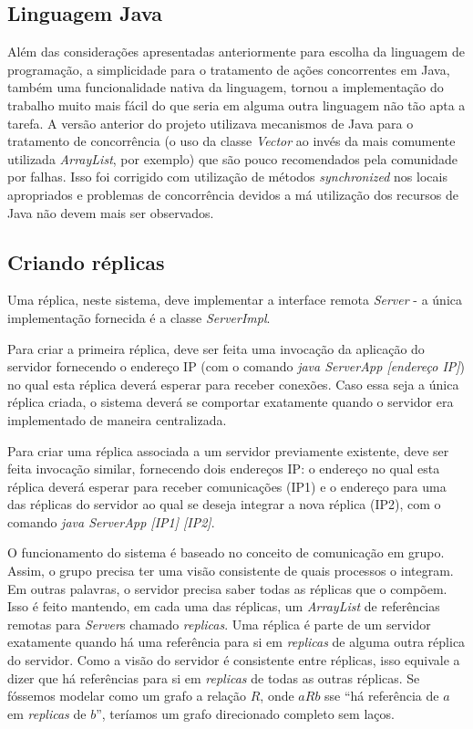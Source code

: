 \documentclass[../main.tex]{subfiles}
\begin{document}
\subsection{Linguagem Java}

Além das considerações apresentadas anteriormente para escolha da linguagem de programação, a simplicidade para o tratamento de ações concorrentes em Java, também uma funcionalidade nativa da linguagem, tornou a implementação do trabalho muito mais fácil do que seria em alguma outra linguagem não tão apta a tarefa.
A versão anterior do projeto utilizava mecanismos de Java para o tratamento de concorrência (o uso da classe \textit{Vector} ao invés da mais comumente utilizada \textit{ArrayList}, por exemplo) que são pouco recomendados pela comunidade por falhas.
Isso foi corrigido com utilização de métodos \textit{synchronized} nos locais apropriados e problemas de concorrência devidos a má utilização dos recursos de Java não devem mais ser observados.

\subsection{Criando réplicas} \label{subsec:replicas}

Uma réplica, neste sistema, deve implementar a interface remota \textit{Server} - a única implementação fornecida é a classe \textit{ServerImpl}.

Para criar a primeira réplica, deve ser feita uma invocação da aplicação do servidor fornecendo o endereço IP (com o comando \textit{java ServerApp [endereço IP]}) no qual esta réplica deverá esperar para receber conexões.
Caso essa seja a única réplica criada, o sistema deverá se comportar exatamente quando o servidor era implementado de maneira centralizada.

Para criar uma réplica associada a um servidor previamente existente, deve ser feita invocação similar, fornecendo dois endereços IP: o endereço no qual esta réplica deverá esperar para receber comunicações (IP1) e o endereço para uma das réplicas do servidor ao qual se deseja integrar a nova réplica (IP2), com o comando \textit{java ServerApp [IP1] [IP2]}.

O funcionamento do sistema é baseado no conceito de comunicação em grupo.
Assim, o grupo precisa ter uma visão consistente de quais processos o integram.
Em outras palavras, o servidor precisa saber todas as réplicas que o compõem.
Isso é feito mantendo, em cada uma das réplicas, um \textit{ArrayList} de referências remotas para \textit{Server}s chamado \textit{replicas}.
Uma réplica é parte de um servidor exatamente quando há uma referência para si em \textit{replicas} de alguma outra réplica do servidor.
Como a visão do servidor é consistente entre réplicas, isso equivale a dizer que há referências para si em \textit{replicas} de todas as outras réplicas.
Se fóssemos modelar como um grafo a relação $R$, onde $aRb$ sse ``há referência de $a$ em \textit{replicas} de $b$'', teríamos um grafo direcionado completo sem laços.
\end{document}
